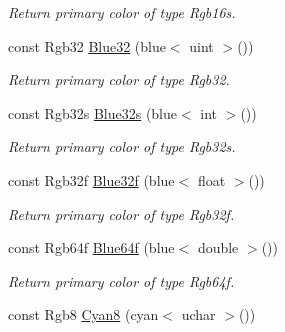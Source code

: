 \begin{DoxyCompactItemize}
\begin{DoxyCompactList}\small\item\em Return primary color of type Rgb16s. \end{DoxyCompactList}\item 
\hypertarget{group___primary_colors_ga0fd8993cf660bfd38f868b62b6587d3e}{const Rgb32 \hyperlink{group___primary_colors_ga0fd8993cf660bfd38f868b62b6587d3e}{Blue32} (blue$<$ uint $>$())}\label{group___primary_colors_ga0fd8993cf660bfd38f868b62b6587d3e}

\begin{DoxyCompactList}\small\item\em Return primary color of type Rgb32. \end{DoxyCompactList}\item 
\hypertarget{group___primary_colors_gafe573892c53f718c47b085e76938d4c7}{const Rgb32s \hyperlink{group___primary_colors_gafe573892c53f718c47b085e76938d4c7}{Blue32s} (blue$<$ int $>$())}\label{group___primary_colors_gafe573892c53f718c47b085e76938d4c7}

\begin{DoxyCompactList}\small\item\em Return primary color of type Rgb32s. \end{DoxyCompactList}\item 
\hypertarget{group___primary_colors_ga20777da7b2c0ea7c12bcddaccf7cd862}{const Rgb32f \hyperlink{group___primary_colors_ga20777da7b2c0ea7c12bcddaccf7cd862}{Blue32f} (blue$<$ float $>$())}\label{group___primary_colors_ga20777da7b2c0ea7c12bcddaccf7cd862}

\begin{DoxyCompactList}\small\item\em Return primary color of type Rgb32f. \end{DoxyCompactList}\item 
\hypertarget{group___primary_colors_ga5ee1a3fcac104fa37c06648fe2ed0b91}{const Rgb64f \hyperlink{group___primary_colors_ga5ee1a3fcac104fa37c06648fe2ed0b91}{Blue64f} (blue$<$ double $>$())}\label{group___primary_colors_ga5ee1a3fcac104fa37c06648fe2ed0b91}

\begin{DoxyCompactList}\small\item\em Return primary color of type Rgb64f. \end{DoxyCompactList}\item 
\hypertarget{group___primary_colors_ga77f239deabd1a53d0cba26c801842b00}{const Rgb8 \hyperlink{group___primary_colors_ga77f239deabd1a53d0cba26c801842b00}{Cyan8} (cyan$<$ uchar $>$())}\label{group___primary_colors_ga77f239deabd1a53d0cba26c801842b00}


\end{DoxyCompactItemize}
